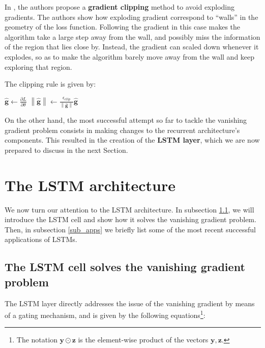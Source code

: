 \documentclass[pdftex,12pt,a4paper]{article}
\theoremstyle{definition}
\theoremstyle{remark}
\newcommand*{\V}[1]{\mathbf{#1}}%
\newcommand{\norm}[1]{\left\lVert#1\right\rVert}
\newcommand{\parder}[2]{\frac{\partial{#1}}{\partial{#2}}}
\begin{document}
\par In \cite{Pascanu2012}, the authors propose a \textbf{gradient clipping} method to avoid exploding gradients. The authors show how exploding gradient correspond to ``walls'' in the geometry of the loss function. Following the gradient in this case makes the algorithm take a large step away from the wall, and possibly miss the information of the region that lies close by. Instead, the gradient can scaled down whenever it explodes, so as to make the algorithm barely move away from the wall and keep exploring that region. 

\par The clipping rule is given by:
\begin{algorithm}
\begin{algorithmic}[1]
\State $\hat{\V{g}} \leftarrow \parder{L}{\theta}$
\If{$\norm{\hat{\V{g}}} \geq \epsilon_{\text{clip}}$}
\State $\norm{\hat{\V{g}}}\leftarrow \frac{\epsilon_{clip}}{\norm{\hat{\V{g}}}}\hat{\V{g}}$
\EndIf
\EndFunction
\end{algorithmic}
\end{algorithm}

\par On the other hand, the most successful attempt so far to tackle the vanishing gradient problem consists in making changes to the recurrent architecture's components. This resulted in the creation of the \textbf{LSTM layer}, which we are now prepared to discuss in the next Section.

\section{The LSTM architecture} \label{sec_lstm}

We now turn our attention to the LSTM architecture. In subsection \ref{sub_lstm}, we will introduce the LSTM cell and show how it solves the vanishing gradient problem. Then, in subsection \ref{sub_apps} we briefly list some of the most recent successful applications of LSTMs.

\subsection{The LSTM cell solves the vanishing gradient problem} \label{sub_lstm}
The LSTM layer \cite{Hochreiter1997,Gers2002} directly addresses the issue of the vanishing gradient by means of a gating mechanism, and is given by the following equations\footnote{The notation $\V{y}\odot \V{z}$ is the element-wise product of the vectors $\V{y,z}$.}:
\end{document}
